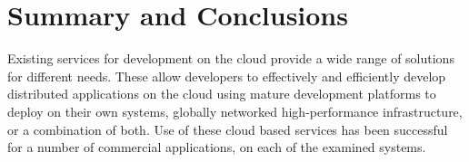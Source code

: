 \chapter{Summary and Conclusions}
Existing services for development on the cloud provide a wide range of solutions for different needs. These allow developers to effectively and efficiently develop distributed applications on the cloud using mature development platforms to deploy on their own systems, globally networked high-performance infrastructure, or a combination of both. Use of these cloud based services has been successful for a number of commercial applications, on each of the examined systems. 
